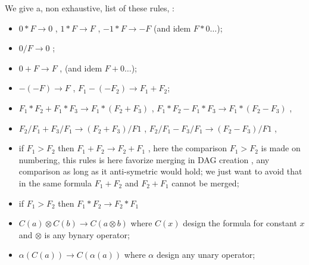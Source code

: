 We give a, non exhaustive, list of these rules, :

\begin{itemize}
     \item  $0*F \rightarrow 0$ ,   $1*F  \rightarrow F$ , $-1*F \rightarrow -F$ (and idem $F*0\dots$);

     \item  $0/F \rightarrow 0$ ;

     \item  $0+F \rightarrow F$ ,   (and idem $F+0\dots$);

     \item  $-(-F) \rightarrow F$ ,  $F_1-(-F_2) \rightarrow F_1+F_2$;

     \item  $F_1*F_2 + F_1*F_3  \rightarrow F_1*(F_2+F_3)$ , $F_1*F_2 - F_1*F_3  \rightarrow F_1*(F_2-F_3)$ , 
     \item  $F_2/F_1 + F_3/F_1  \rightarrow (F_2+F_3)/F1$ ,  $F_2/F_1 - F_3/F_1  \rightarrow (F_2-F_3)/F1$ , 

     \item if  $F_1 > F_2$ then  $F_1 + F_2  \rightarrow F_2 + F_1$ , here the comparison $F_1 > F_2$ 
           is made on numbering, this rules is here favorize merging in DAG creation , any comparison as long
           as it anti-symetric would hold; we just want to avoid that in the same formula $F_1+F_2$ and $F_2+F_1$
	   cannot be merged;
     \item if  $F_1 > F_2$ then  $F_1 * F_2  \rightarrow F_2 * F_1$ 

     \item  $C(a) \otimes C(b) \rightarrow C(a \otimes b) $  where  $C(x)$ design the formula for constant $x$
	     and $\otimes$ is any bynary operator;
     \item  $ \alpha (C(a)) \rightarrow C(\alpha (a)) $  where  $\alpha$ design any unary operator;

\end{itemize}





